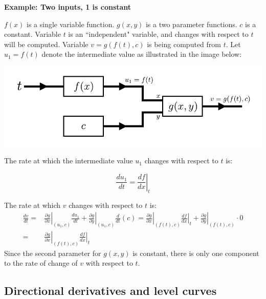 \documentclass{article}
\begin{document}
\vspace{5mm}

\textbf{Example: Two inputs, 1 is constant}

\(f(x)\) is a single variable function. \(g(x, y)\) is a two parameter functions. \(c\) is a constant. Variable \(t\) is an ``independent" variable, and changes with respect to \(t\) will be computed. Variable \(v = g(f(t), c)\) is being computed from \(t\). Let \(u_1 = f(t)\) denote the intermediate value as illustrated in the image below:  

\begin{center}
\includegraphics[scale = 1.0]{flow_chart_4}
\end{center}

The rate at which the intermediate value \(u_1\) changes with respect to \(t\) is:

\[\frac{du_1}{dt} = \left.\frac{df}{dx}\right|_t\]

The rate at which \(v\) changes with respect to \(t\) is:
\begin{align*}
\frac{dv}{dt} = & \left.\frac{\partial g}{\partial x}\right|_{(u_1, c)} \frac{du_1}{dt} + \left.\frac{\partial g}{\partial y}\right|_{(u_1, c)} \frac{d}{dt}(c) 
= \left.\frac{\partial g}{\partial x}\right|_{(f(t), c)} \left.\frac{df}{dx}\right|_t + \left.\frac{\partial g}{\partial y}\right|_{(f(t), c)} \cdot 0 
\\
= & \left.\frac{\partial g}{\partial x}\right|_{(f(t), c)} \left.\frac{df}{dx}\right|_t    
\end{align*}
Since the second parameter for \(g(x,y)\) is constant, there is only one component to the rate of change of \(v\) with respect to \(t\).



\subsection*{Directional derivatives and level curves}
\end{document}
